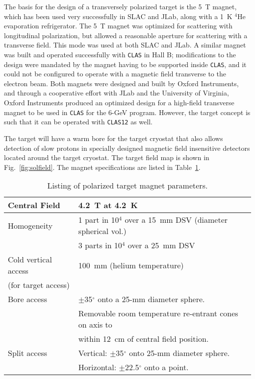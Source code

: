 The basis for the design of a transversely polarized target is the 5~T 
magnet, which has been used very successfully in SLAC and JLab, along 
with a 1~K $^4$He evaporation refrigerator. The 5~T magnet was optimized 
for scattering with longitudinal polarization, but allowed a reasonable 
aperture for scattering with a transverse field.  This mode was used at 
both SLAC and JLab.  A similar magnet was built and operated successfully
with {\tt CLAS} in Hall B; modifications to the design were mandated by 
the magnet having to be supported inside {\tt CLAS}, and it could not be 
configured to operate with a magnetic field transverse to the electron beam. 
Both magnets were designed and built by Oxford Instruments, and through a 
cooperative effort with JLab and the University of Virginia, Oxford 
Instruments produced an optimized design for a high-field transverse magnet 
to be used in {\tt CLAS} for the 6-GeV program.  However, the target concept 
is such that it can be operated with {\tt CLAS12} as well.
 
The target will have a warm bore for the target cryostat that also allows 
detection of slow protons in specially designed magnetic field insensitive 
detectors located around the target cryostat. The target field map is shown 
in Fig.~\ref{fig:solfield}.  The magnet specifications are listed in 
Table~\ref{mag_parms}.

\begin{table}[htbp]
\begin{center}
\begin{tabular}{|l|l|} \hline 
Central Field & 4.2~T at 4.2~K \\ \hline
Homogeneity   & 1 part in 10$^4$ over a 15~mm DSV (diameter spherical vol.) \\
              & 3 parts in 10$^4$ over a 25~mm DSV \\ \hline
Cold vertical access & 100~mm (helium temperature) \\
(for target access)  &                             \\ \hline
Bore access   & $\pm$35$^\circ$ onto a 25-mm diameter sphere. \\
              & Removable room temperature re-entrant cones on axis to \\
              & within 12~cm of central field position. \\ \hline
Split access  & Vertical: $\pm$35$^\circ$ onto 25-mm diameter sphere. \\
              & Horizontal: $\pm$22.5$^\circ$ onto a point. \\ \hline
\end{tabular}
\end{center}
\caption{\small{Listing of polarized target magnet parameters.}}
\label{mag_parms}
\end{table} 

